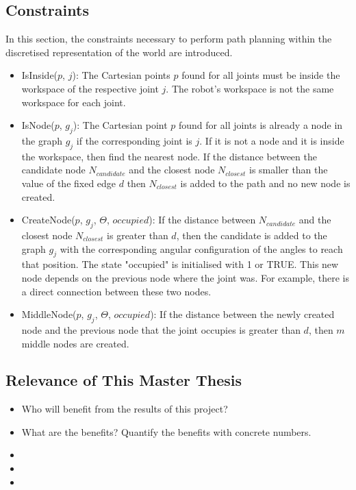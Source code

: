 \documentclass[thesis]{mas_proposal}
\begin{document}
\subsection{Constraints}
	In this section, the constraints necessary to perform path planning within the discretised representation of the world are introduced.
	\begin{itemize}
		\item IsInside($p$, $j$): The Cartesian points $p$ found for all joints must be inside the workspace of the respective joint $j$. The robot's workspace is not the same workspace for each joint.
		\item IsNode($p$, $g_j$): The Cartesian point $p$ found for all joints is already a node in the graph $g_j$ if the corresponding joint is $j$. If it is not a node and it is inside the workspace, then find the nearest node. If the distance between the candidate node $N_{candidate}$ and the closest node $N_{closest}$ is smaller than the value of the fixed edge $d$ then $N_{closest}$ is added to the path and no new node is created.
		\item CreateNode($p$, $g_j$, $\Theta$, $occupied$): If the distance between $N_{candidate}$ and the closest node $N_{closest}$ is greater than $d$, then the candidate is added to the graph $g_j$ with the corresponding angular configuration of the angles to reach that position. The state "occupied" is initialised with 1 or TRUE.  This new node depends on the previous node where the joint was. For example, there is a direct connection between these two nodes.
		\item MiddleNode($p$, $g_j$, $\Theta$, $occupied$): If the distance between the newly created node and the previous node that the joint occupies is greater than $d$, then $m$ middle nodes are created.  
		
		
	\end{itemize} 
\subsection{Relevance of This Master Thesis}
\begin{itemize}
    \item Who will benefit from the results of this project?
    \item What are the benefits? Quantify the benefits with concrete numbers.
    \item 
    \item 
    \item 
 \end{itemize}
\end{document}
